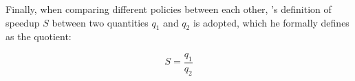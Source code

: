 
Finally, when comparing different policies between each other, \citet{Milo2012}'s definition of speedup $S$ between two quantities $q_1$ and $q_2$ is adopted, which he formally defines as the quotient: 

\begin{equation}
	S=\frac{q_1}{q_2}
\end{equation}
